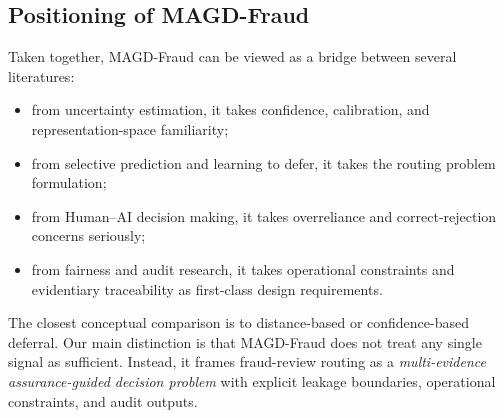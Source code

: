 \subsection{Positioning of MAGD-Fraud}
\label{subsec:rw_positioning}

Taken together, MAGD-Fraud can be viewed as a bridge between several literatures:
\begin{itemize}
\item from uncertainty estimation, it takes confidence, calibration, and representation-space familiarity;
\item from selective prediction and learning to defer, it takes the routing problem formulation;
\item from Human--AI decision making, it takes overreliance and correct-rejection concerns seriously;
\item from fairness and audit research, it takes operational constraints and evidentiary traceability as first-class design requirements.
\end{itemize}

The closest conceptual comparison is to distance-based or confidence-based deferral. Our main distinction is that MAGD-Fraud does not treat any single signal as sufficient. Instead, it frames fraud-review routing as a \emph{multi-evidence assurance-guided decision problem} with explicit leakage boundaries, operational constraints, and audit outputs.
